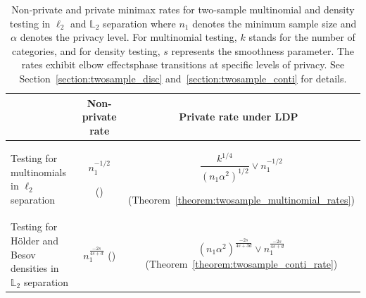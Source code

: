 \documentclass[twoside,11pt]{article}
\newcommand{\dimDensity}{d} %
\newcommand{\alphabetSize}{k} %
\newcommand{\sampleSize}{n}
\newcommand{\smoothness}{s}
\newcommand{\privacyParameter}{\alpha} %
\begin{document}
\begin{table}
	\caption{Non-private and private minimax rates for two-sample multinomial and density testing in $\ell_2$ and $\mathbb{L}_2$ separation where $\sampleSize_1$ denotes the minimum sample size and $\privacyParameter$ denotes the privacy level. For multinomial testing, $\alphabetSize$ stands for the number of categories, and for density testing, $\smoothness$ represents the smoothness parameter.
		The rates exhibit elbow effects{\textemdash}phase transitions at specific levels of privacy.
		See Section~\ref{section:twosample_disc} and~\ref{section:twosample_conti} for details.
	}
	\label{table:rates}
	\small
	\begin{center}
		\begin{tabular}{lcc}
			\toprule
			&Non-private rate & Private rate under LDP\ \\
			\midrule
			\rule{0pt}{15pt}
			\makecell{Testing for multinomials \\ in $\ell_2$ separation}
			&
			\makecell{$\sampleSize_1^{-1/2}$
				\\
				(\citet{chan2014optimal,kim_minimax_2022})
			}
			&
			\makecell{$
				\dfrac{\alphabetSize^{1/4}}{{(\sampleSize_1 \privacyParameter^2)^{1/2}}}
				\vee
				\sampleSize_1^{-1/2}
				$
				\\
				(Theorem~\ref{theorem:twosample_multinomial_rates})
			}
			\\
			\rule{0pt}{25pt}
			\makecell{
				Testing for H\"{o}lder and Besov \\densities in $\mathbb{L}_2$ separation}
			&%
			\makecell{ $\sampleSize_1^{\frac{-2s}{4\smoothness+\dimDensity}}$\\ (\citet{Arias-Castro2018RememberDimension})
			}
			&%
			\makecell{$(\sampleSize_1\privacyParameter^2)^{\frac{-2s}{4\smoothness+3\dimDensity}} 
				\vee
				\sampleSize_1^{\frac{-2s}{4\smoothness+\dimDensity}}$
				\\(Theorem~\ref{theorem:twosample_conti_rate})
			}
			\\
			\bottomrule
		\end{tabular}
	\end{center}
\end{table}
%
\end{document}
